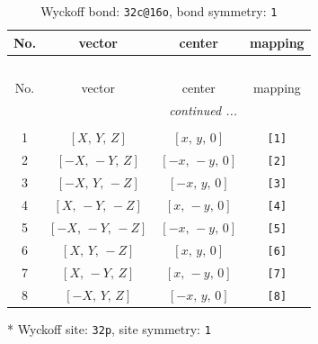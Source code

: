 \documentclass[fleqn,8pt]{jsarticle}
\begin{document}
\renewcommand{\arraystretch}{1.2}
\begin{longtable}{cccc}
\caption{Wyckoff bond: {\tt 32c@16o}, bond symmetry: {\tt 1}}
 \\
 \hline \hline
No. & vector & center & mapping \\ \hline \endfirsthead

\multicolumn{3}{l}{\tablename\ \thetable{}} \\
 \hline \hline
No. & vector & center & mapping \\ \hline \endhead

 \hline \hline
\multicolumn{3}{r}{\footnotesize\it continued ...} \\ \endfoot

 \hline \hline
\multicolumn{3}{r}{} \\ \endlastfoot

1 & $\left[ X,\, Y,\, Z \right]$ & $\left[ x,\, y,\, 0 \right]$ & {\tt [1]} \\ \hline
2 & $\left[ - X,\, - Y,\, Z \right]$ & $\left[ - x,\, - y,\, 0 \right]$ & {\tt [2]} \\ \hline
3 & $\left[ - X,\, Y,\, - Z \right]$ & $\left[ - x,\, y,\, 0 \right]$ & {\tt [3]} \\ \hline
4 & $\left[ X,\, - Y,\, - Z \right]$ & $\left[ x,\, - y,\, 0 \right]$ & {\tt [4]} \\ \hline
5 & $\left[ - X,\, - Y,\, - Z \right]$ & $\left[ - x,\, - y,\, 0 \right]$ & {\tt [5]} \\ \hline
6 & $\left[ X,\, Y,\, - Z \right]$ & $\left[ x,\, y,\, 0 \right]$ & {\tt [6]} \\ \hline
7 & $\left[ X,\, - Y,\, Z \right]$ & $\left[ x,\, - y,\, 0 \right]$ & {\tt [7]} \\ \hline
8 & $\left[ - X,\, Y,\, Z \right]$ & $\left[ - x,\, y,\, 0 \right]$ & {\tt [8]} \\
\end{longtable}
* Wyckoff site: {\tt 32p}, site symmetry: {\tt 1}
\renewcommand{\arraystretch}{1.2}
\end{document}
